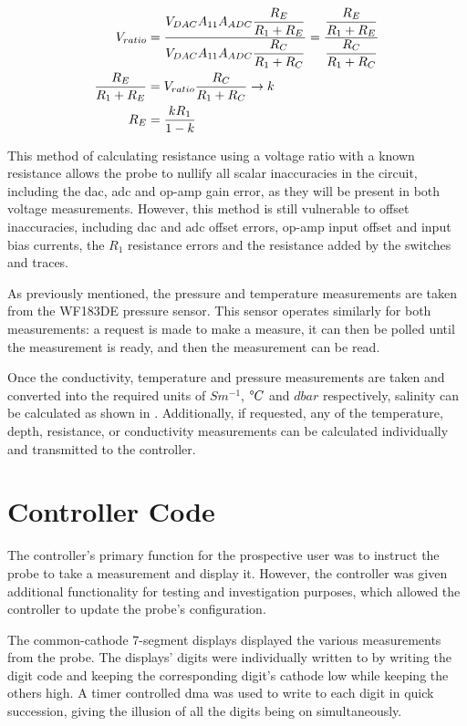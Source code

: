 \begin{align}
 V_{ratio} &= \frac{\displaystyle V_{DAC}A_{11}A_{ADC}\frac{\displaystyle R_E}{\displaystyle R_1 + R_E}}{\displaystyle V_{DAC}A_{11}A_{ADC}\frac{\displaystyle R_C}{\displaystyle R_1 + R_C}} = \frac{\displaystyle\frac{\displaystyle R_E}{\displaystyle R_1 + R_E}}{\displaystyle\frac{\displaystyle R_C}{\displaystyle R_1 + R_C}} \label{eqn:electrode-calib-resistance} \\
 \frac{\displaystyle R_E}{\displaystyle R_1 + R_E} &= V_{ratio} \frac{\displaystyle R_C}{\displaystyle R_1 + R_C} \rightarrow k \label{eqn:electrode-calib-resistance-simplified} \\
 R_E &= \frac{\displaystyle kR_1}{\displaystyle1 - k} \label{eqn:electrode-calib-resistance-final}
\end{align}

This method of calculating resistance using a voltage ratio with a known resistance allows the probe to nullify all scalar inaccuracies in the circuit, including the \gls{dac}, \gls{adc} and op-amp gain error, as they will be present in both voltage measurements.
However, this method is still vulnerable to offset inaccuracies, including \gls{dac} and \gls{adc} offset errors, op-amp input offset and input bias currents, the $R_1$ resistance errors and the resistance added by the switches and traces.

As previously mentioned, the pressure and temperature measurements are taken from the WF183DE pressure sensor.
This sensor operates similarly for both measurements: a request is made to make a measure, it can then be polled until the measurement is ready, and then the measurement can be read.

Once the conductivity, temperature and pressure measurements are taken and converted into the required units of $Sm^{-1}$, $\degree C$ and $dbar$ respectively, salinity can be calculated as shown in .
Additionally, if requested, any of the temperature, depth, resistance, or conductivity measurements can be calculated individually and transmitted to the controller.

\section{Controller Code}

The controller's primary function for the prospective user was to instruct the probe to take a measurement and display it. However, the controller was given additional functionality for testing and investigation purposes, which allowed the controller to update the probe's configuration.

The common-cathode 7-segment displays displayed the various measurements from the probe.
The displays' digits were individually written to by writing the digit code and keeping the corresponding digit's cathode low while keeping the others high.
A timer controlled \gls{dma} was used to write to each digit in quick succession, giving the illusion of all the digits being on simultaneously.

